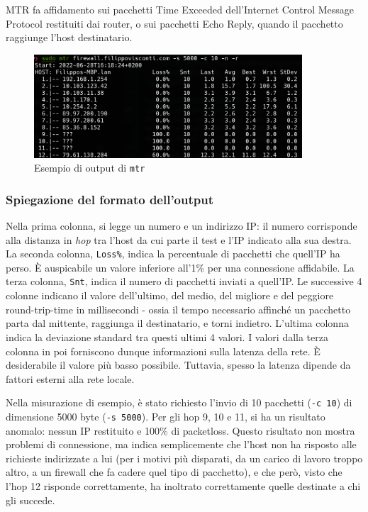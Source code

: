 MTR fa affidamento sui pacchetti Time Exceeded dell'Internet Control Message Protocol restituiti dai router, o sui pacchetti Echo Reply, quando il pacchetto raggiunge l'host destinatario.

\begin{figure}[ht]
    \centering
    \includegraphics[width=10cm]{figure/mtrSample.png}
    \caption{Esempio di output di \texttt{mtr}}
\end{figure}

\subsubsection{Spiegazione del formato dell'output}
Nella prima colonna, si legge un numero e un indirizzo IP: il numero corrisponde alla distanza in \emph{hop} tra l'host da cui parte il test e l'IP indicato alla sua destra.
La seconda colonna, \texttt{Loss\%}, indica la percentuale di pacchetti che quell'IP ha perso. È auspicabile un valore inferiore all'1\% per una connessione affidabile.
La terza colonna, \texttt{Snt}, indica il numero di pacchetti inviati a quell'IP.
Le successive 4 colonne indicano il valore dell'ultimo, del medio, del migliore e del peggiore round-trip-time in millisecondi - ossia il tempo necessario affinché un pacchetto parta dal mittente, raggiunga il destinatario, e torni indietro.
L'ultima colonna indica la deviazione standard tra questi ultimi 4 valori.
I valori dalla terza colonna in poi forniscono dunque informazioni sulla latenza della rete. È desiderabile il valore più basso possibile. Tuttavia,  spesso la latenza dipende da fattori esterni alla rete locale.

Nella misurazione di esempio, è stato richiesto l'invio di 10 pacchetti (\texttt{-c 10}) di dimensione 5000 byte (\texttt{-s 5000}).
Per gli hop 9, 10 e 11, si ha un risultato anomalo: nessun IP restituito e 100\% di packetloss.
Questo risultato non mostra problemi di connessione, ma indica semplicemente che l'host non ha risposto alle richieste indirizzate a lui (per i motivi più disparati, da un carico di lavoro troppo altro, a un firewall che fa cadere quel tipo di pacchetto), e che però, visto che l'hop 12 risponde correttamente, ha inoltrato correttamente quelle destinate a chi gli succede.


